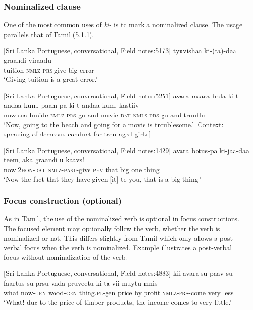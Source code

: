 \subsubsection{Nominalized clause}%

One of the most common uses of \textit{ki-} is to mark a nominalized clause. The usage parallels that of Tamil (5.1.1).

\ea\label{smith:ex:50}
{}[Sri Lanka Portuguese, conversational, Field notes:5173]
\gll tyuvishan ki-(ta)-daa graandi viraadu\\
tuition \textsc{nmlz}-\textsc{prs}-give big error\\
`Giving tuition is a great error.'
\z

\ea\label{smith:ex:51}
{}[Sri Lanka Portuguese, conversational, Field notes:5251]
\gll avara maara b{\textopeno}{\textopeno}rda ki-t-andaa kum, pa{\textrtaild}am-pa ki-t-andaa kum, kastiiv\\ 
now sea beside \textsc{nmlz}-\textsc{prs}-go and movie-\textsc{dat} \textsc{nmlz}-\textsc{prs}-go and trouble \\
`Now, going to the beach and going for a movie is troublesome.' [Context: speaking of decorous conduct for teen-aged girls.]
\z

\ea\label{smith:ex:52}
{}[Sri Lanka Portuguese, conversational, Field notes:1429]
\gll avara botus-pa ki-jaa-daa teem, aka graandi u{\ng} kaavs!\\
now 2\textsc{hon}-\textsc{dat} \textsc{nmlz}-\textsc{past}-give \textsc{pfv} that big one thing \\
`Now the fact that they have given [it] to you, that is a big thing!'
\z


\subsubsection{Focus construction (optional)}%
As in Tamil, the use of the nominalized verb is optional in focus constructions. The focused element may optionally follow the verb, whether the verb is nominalized or not. This differs slightly from Tamil which only allows a post-verbal focus when the verb is nominalized. Example  illustrates a post-verbal focus without nominalization of the verb.

\ea\label{smith:ex:53}
{}[Sri Lanka Portuguese, conversational, Field notes:4883]
\gll kii avara-su paav-su faartus-su pr{\textepsilon}{\textepsilon}su v{\textopeno}{\textopeno}nda pruveetu ki-ta-vii muytu m{\textepsilon}{\textepsilon}nis\\
what now-\textsc{gen} wood-\textsc{gen} thing.\textsc{pl}-gen price by profit \textsc{nmlz}-\textsc{prs}-come very less\\
`What! due to the price of timber products, the income comes to very little.'\footnotemark{}
\z
{}

